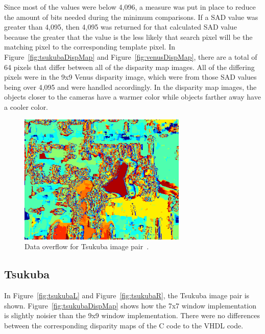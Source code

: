 Since most of the values were below 4,096, a measure was put in place to reduce the amount of bits needed during the minimum comparisons. If a SAD value was greater than 4,095, then 4,095 was returned for that calculated SAD value because the greater that the value is the less likely that search pixel will be the matching pixel to the corresponding template pixel. In Figure~\ref{fig:tsukubaDispMap} and Figure~\ref{fig:venusDispMap}, there are a total of 64 pixels that differ between all of the disparity map images. All of the differing pixels were in the 9x9 Venus disparity image, which were from those SAD values being over 4,095 and were handled accordingly. In the disparity map images, the objects closer to the cameras have a warmer color while objects farther away have a cooler color. %

\begin{figure}[h]
	\begin{center}
		\includegraphics[width=80mm]{figures/tsukuba_disp9x9_2_sad_overflow.png}
		\captionfonts
		\caption{Data overflow for Tsukuba image pair~\cite{middlebury}.}
		\label{fig:overflow}
	\end{center}
\end{figure}

\subsection{Tsukuba}
\label{sec:tsukuba}

In Figure~\ref{fig:tsukubaL} and Figure~\ref{fig:tsukubaR}, the Tsukuba image pair is shown. Figure~\ref{fig:tsukubaDispMap} shows how the 7x7 window implementation is slightly noisier than the 9x9 window implementation. There were no differences between the corresponding disparity maps of the C code to the VHDL code.


